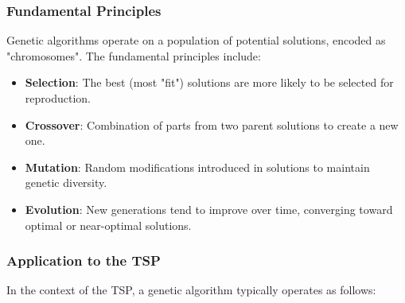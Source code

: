 \subsubsection{Fundamental Principles}

Genetic algorithms operate on a population of potential solutions, encoded as "chromosomes". The fundamental principles include:

\begin{itemize}
	\item \textbf{Selection}: The best (most "fit") solutions are more likely to be selected for reproduction.
	\item \textbf{Crossover}: Combination of parts from two parent solutions to create a new one.
	\item \textbf{Mutation}: Random modifications introduced in solutions to maintain genetic diversity.
	\item \textbf{Evolution}: New generations tend to improve over time, converging toward optimal or near-optimal solutions.
\end{itemize}

\subsubsection{Application to the \Gls{TSP}}

In the context of the \Gls{TSP}, a genetic algorithm typically operates as follows:

